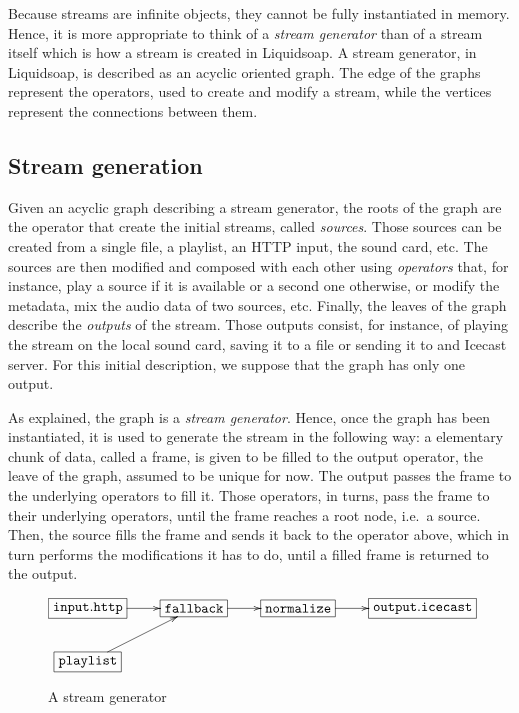 \documentclass{llncs}
\newcommand{\liquidsoap}{Liquidsoap}
\newcommand{\ie}{{i.e.}}
\begin{document}
Because streams are infinite objects, they cannot be fully instantiated in memory. Hence, it is 
more appropriate to think of a \textit{stream generator} than of a stream itself which is how
a stream is created in \liquidsoap{}. A stream generator, in \liquidsoap{}, is described as 
an acyclic oriented graph. The edge of the graphs represent the operators, used to create and modify
a stream, while the vertices represent the connections between them.

\subsection*{Stream generation}

Given an acyclic graph describing a stream generator, the roots of the graph are the operator that create 
the initial streams, called \textit{sources}. Those sources can be created from a single file, a playlist, an HTTP input,
the sound card, etc. The sources are then modified and composed with each other using 
\textit{operators} that, for instance, play a source if it is available or a second one otherwise, or modify
the metadata, mix the audio data of two sources, etc.
Finally, the leaves of the graph describe the \textit{outputs} of the stream. Those outputs consist, for instance,
of playing the stream on the local sound card, saving it to a file or sending it to and Icecast server. 
For this initial description, we suppose that the graph has only one output.

As explained, the graph is a \textit{stream generator}. Hence, once the graph has been instantiated,
it is used to generate the stream in the following way: a elementary chunk of data, called a frame, is given to be filled to the 
output operator, the leave of the graph, assumed to be unique for now. 
The output passes the frame to the underlying operators to fill it. Those operators, in turns, pass the frame to their 
underlying operators, until the frame reaches a root node, \ie\ a source. 
Then, the source fills the frame and sends it back to the operator above, which in turn performs
the modifications it has to do, until a filled frame is returned to the output.

\begin{figure}[htn]
 \begin{center}
\[
\xymatrix{
  *+[F]{\mathtt{input.http}}\ar[r]&*+[F]{\mathtt{fallback}}\ar[r]&
  *+[F]{\mathtt{normalize}}\ar[r]&
  *+[F]{\mathtt{output.icecast}}\\
  *+[F]{\mathtt{playlist}}\ar[ur]&\\
}
\]
\end{center}
 \caption{A stream generator}
\end{figure}
\end{document}
